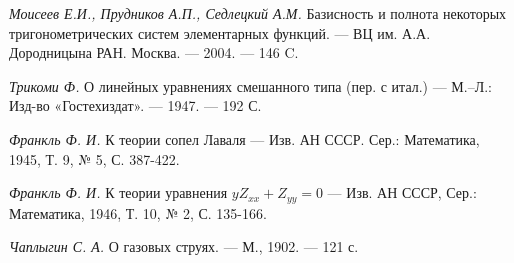 ﻿\documentclass[oneside, final, 14pt]{extreport}
\begin{document}
\begin{thebibliography}{30}
	{\it Моисеев Е.И., Прудников А.П., Седлецкий А.М.} Базисность и полнота некоторых тригонометрических систем элементарных функций. —
	ВЦ им. А.А. Дородницына РАН. Москва. — 2004. — 146 C.
	
	{\it Трикоми Ф.} О линейных уравнениях смешанного типа (пер. с итал.) —
	М.–Л.: Изд-во «Гостехиздат». — 1947. — 192 С.
	
	{\it Франкль Ф. И.} К теории сопел Лаваля —
	Изв. АН СССР. Сер.: Математика, 1945, Т. 9, № 5, С. 387-422.
	
	{\it Франкль Ф. И.} К теории уравнения $yZ_{xx} + Z_{yy} = 0$ —
	Изв. АН СССР, Сер.: Математика, 1946, Т. 10, № 2, С. 135-166.
	
	{\it Чаплыгин С. А.}  О газовых струях. — М., 1902. — 121 с.
	
\end{thebibliography}
\end{document}
